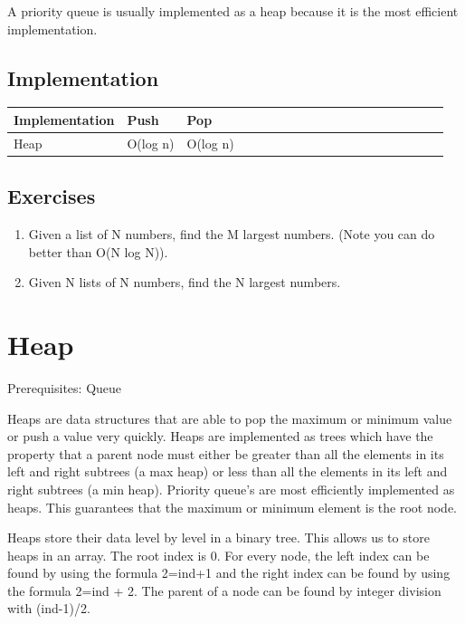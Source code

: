 \documentclass[11pt,oneside]{book}
\begin{document}
A priority queue is usually implemented as a heap because it is the most efficient implementation.

\subsection{Implementation}

\vspace{10px}\begin{tabulary}{0.4\linewidth}{|l|l|l|l|l|l|l|l|l|l|l|l|l|l|l|l|l|l|l}\hline


  Implementation &
  Push &
  Pop\\
\hline


  Heap &
  O(log n) &
  O(log n)\\

\hline\end{tabulary}

\subsection{Exercises}

\begin{enumerate}
\item Given a list of N numbers, find the M largest numbers. (Note you can do better than O(N log N)).
\item Given N lists of N numbers, find the N largest numbers.
\end{enumerate}

        \section{ Heap }
        

Prerequisites: Queue



Heaps are data structures that are able to pop the maximum or minimum value or push a value very quickly. Heaps are implemented as trees which have the property that a parent node must either be greater than all the elements in its left and right subtrees (a max heap) or less than all the elements in its left and right subtrees (a min heap). Priority queue's are most efficiently implemented as heaps. This guarantees that the maximum or minimum element is the root node.

Heaps store their data level by level in a binary tree. This allows us to store heaps in an array. The root index is 0. For every node, the left index can be found by using the formula 2=ind+1 and the right index can be found by using the formula 2=ind + 2. The parent of a node can be found by integer division with (ind-1)/2.
\end{document}
